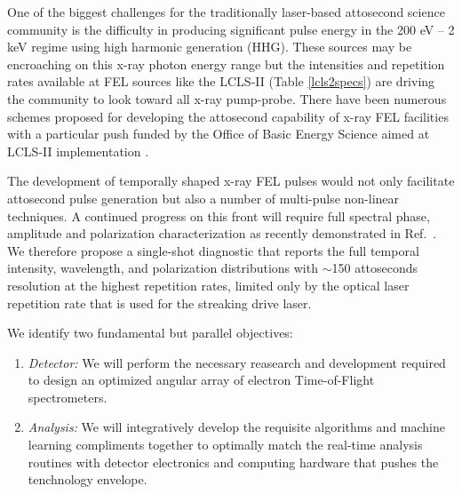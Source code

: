One of the biggest challenges for the traditionally laser-based attosecond science community is the difficulty in producing significant pulse energy in the 200 eV -- 2 keV regime using high harmonic generation (HHG)\cite{Chen2014,Schmidt2016}.
These sources may be encroaching on this x-ray photon energy range \cite{Biegert2014,Zenghu2017} but the intensities and repetition rates available at FEL sources like the LCLS-II (Table \ref{lcls2specs}) are driving the community to look toward all x-ray pump-probe. 
There have been numerous schemes proposed for developing the attosecond capability of x-ray FEL facilities \cite{Ding2009,Xiang2009} with a particular push funded by the Office of Basic Energy Science aimed at LCLS-II implementation \cite{Marinelli2016,xLEAP}.

The development of temporally shaped x-ray FEL pulses would not only facilitate attosecond pulse generation but also a number of multi-pulse non-linear techniques\cite{Review2017}.
A continued progress on this front \cite{Lutman13_twocolor,Marinelli13_twocolor,Allaria2014,Ding2015,Marinelli2015,HeaterShaping2016,Prince2016,Lutman2016,Marinelli2016} will require full spectral phase, amplitude and polarization characterization as recently demonstrated in Ref.~\cite{Nick2018}.
We therefore propose a single-shot diagnostic that reports the full temporal intensity, wavelength, and polarization distributions with $\sim$150 attoseconds resolution at the highest repetition rates, limited only by the optical laser repetition rate that is used for the streaking drive laser.

We identify two fundamental but parallel objectives:
\begin{enumerate}
\item \emph{Detector:} We will perform the necessary reasearch and development required to design an optimized angular array of electron Time-of-Flight spectrometers.
\item \emph{Analysis:} We will integratively develop the requisite algorithms and machine learning compliments together to optimally match the real-time analysis routines with detector electronics and computing hardware that pushes the tenchnology envelope.
\end{enumerate}


